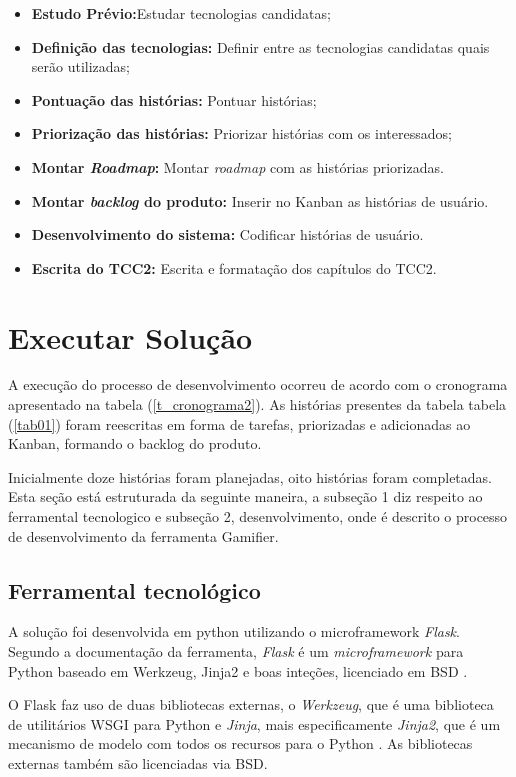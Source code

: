 \begin{itemize}
\item  \textbf {Estudo Prévio:}Estudar tecnologias candidatas;
\item  \textbf {Definição das tecnologias:} Definir entre as tecnologias candidatas quais serão utilizadas;
\item  \textbf {Pontuação das histórias:} Pontuar histórias;
\item  \textbf {Priorização das histórias:} Priorizar histórias com os interessados;
\item  \textbf {Montar \textit{Roadmap}:} Montar \textit{roadmap} com as histórias priorizadas.
\item  \textbf {Montar \textit{backlog} do produto:} Inserir no Kanban as histórias de usuário.
\item  \textbf{Desenvolvimento do sistema:} Codificar histórias de usuário.
\item  \textbf{Escrita do TCC2:} Escrita e formatação dos capítulos do TCC2.
\end{itemize}

\section {Executar Solução}

A execução do processo de desenvolvimento ocorreu de acordo com o cronograma apresentado na tabela (\ref{t_cronograma2}). As histórias presentes da  tabela tabela (\ref{tab01}) foram reescritas em forma de tarefas, priorizadas e adicionadas ao Kanban, formando o backlog do produto. 

Inicialmente doze histórias foram planejadas, oito histórias foram completadas.
Esta seção está estruturada da seguinte maneira, a subseção 1 diz respeito ao ferramental tecnologico e subseção 2, desenvolvimento, onde é descrito o processo de desenvolvimento da ferramenta Gamifier.

\subsection {Ferramental tecnológico}

A solução foi desenvolvida em python utilizando o microframework \textit{Flask}. Segundo a documentação da ferramenta, \textit{Flask} é um \textit{microframework} para Python baseado em Werkzeug, Jinja2 e boas inteções, licenciado em BSD \cite{flask}. 

O Flask faz uso de duas bibliotecas externas, o \textit{Werkzeug}, que é uma biblioteca de utilitários WSGI para Python \cite{werkzeug} e \textit{Jinja}, mais especificamente \textit{Jinja2}, que é um mecanismo de modelo com todos os recursos para o Python \cite{jinja2}. As bibliotecas externas também são licenciadas via BSD.

